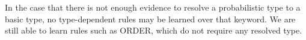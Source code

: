 
In the case that there is not enough evidence to resolve a probabilistic type to a basic type, no type-dependent rules may be learned over that keyword.
We are still able to learn rules such as {\scriptsize ORDER}, which do not require any resolved type. 


